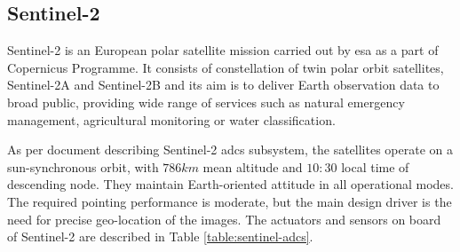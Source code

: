 






    \subsection{Sentinel-2}\label{sec:sentinel}
    
        Sentinel-2 is an European polar satellite mission carried out by \ac{esa} as a part of Copernicus Programme. It consists of constellation of twin polar orbit satellites, Sentinel-2A and Sentinel-2B and its aim is to deliver Earth observation data to broad public, providing wide range of services such as natural emergency management, agricultural monitoring or water classification\cite{sentinel2user}.

        As per document describing Sentinel-2 \ac{adcs} subsystem, the satellites operate on a sun-synchronous orbit, with $786km$ mean altitude and $10:30$ local time of descending node. They maintain Earth-oriented attitude in all operational modes. The required pointing performance is moderate, but the main design driver is the need for precise geo-location of the images\cite{wiedermann2014sentinel}. The actuators and sensors on board of Sentinel-2 are described in Table \ref{table:sentinel-adcs}.

            
